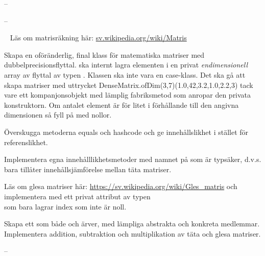 \SubtaskSolved  -- %

\SubtaskSolved  -- %



\QUESTEND







\QUESTBEGIN

\Task  \what~   Läs om matrisräkning här: \href{https://sv.wikipedia.org/wiki/Matris}{sv.wikipedia.org/wiki/Matris}

\Subtask Skapa en oföränderlig, final klass  för matematiska matriser med dubbelprecisionsflyttal.  ska internt lagra elementen i en privat \emph{endimensionell} array av flyttal av typen . Klassen ska inte vara en case-klass. Det ska gå att skapa matriser med uttrycket DenseMatrix.ofDim(3,7)(1.0,42,3.2,1.0,2.2,3) tack vare ett kompanjonsobjekt med lämplig fabriksmetod som anropar den privata konstruktorn.  Om antalet element är för litet i förhållande till den angivna dimensionen så fyll på med nollor.

\Subtask Överskugga metoderna equals och hashcode och ge  innehållslikhet i stället för referenslikhet.

\Subtask Implementera egna innehålllikhetsmetoder med namnet \code{===} på  som är typsäker, d.v.s. bara tillåter innehållsjämförelse mellan täta matriser.

\Subtask Läs om glesa matriser här: \href{https://sv.wikipedia.org/wiki/Gles_matris}{https://sv.wikipedia.org/wiki/Gles\_matris} och implementera  med ett privat attribut av typen \\  som bara lagrar index som inte är noll.

\Subtask Skapa ett  som både  och  ärver, med lämpliga abstrakta och konkreta medlemmar. Implementera addition, subtraktion och multiplikation av täta och glesa matriser.

%
%


\TaskSolved \what

\SubtaskSolved  -- %
\QUESTEND

